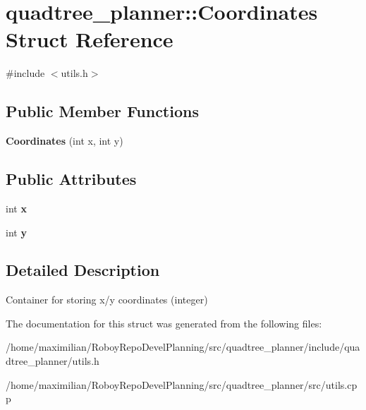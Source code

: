 \hypertarget{structquadtree__planner_1_1Coordinates}{}\section{quadtree\+\_\+planner\+:\+:Coordinates Struct Reference}
\label{structquadtree__planner_1_1Coordinates}


{\ttfamily \#include $<$utils.\+h$>$}

\subsection*{Public Member Functions}
\begin{DoxyCompactItemize}
\item 
\mbox{\label{structquadtree__planner_1_1Coordinates_ad815a528caf5c0fcd801f777e83cf5ff}} 
{\bfseries Coordinates} (int x, int y)
\end{DoxyCompactItemize}
\subsection*{Public Attributes}
\begin{DoxyCompactItemize}
\item 
\mbox{\label{structquadtree__planner_1_1Coordinates_a089df06f81f178e3d472bdcc30bea797}} 
int {\bfseries x}
\item 
\mbox{\label{structquadtree__planner_1_1Coordinates_a905d2402bc151275af1701361c251805}} 
int {\bfseries y}
\end{DoxyCompactItemize}


\subsection{Detailed Description}
Container for storing x/y coordinates (integer) 

The documentation for this struct was generated from the following files\+:\begin{DoxyCompactItemize}
\item 
/home/maximilian/\+Roboy\+Repo\+Devel\+Planning/src/quadtree\+\_\+planner/include/quadtree\+\_\+planner/utils.\+h\item 
/home/maximilian/\+Roboy\+Repo\+Devel\+Planning/src/quadtree\+\_\+planner/src/utils.\+cpp\end{DoxyCompactItemize}
